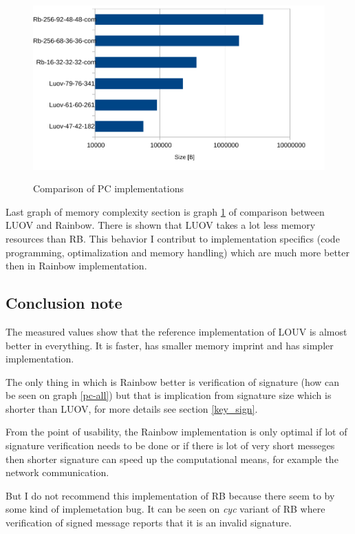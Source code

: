 \documentclass[thesis=M,english]{FITthesis}[2019/12/23]
\begin{document}
\begin{figure}[H]
\centering
\includegraphics[width=13cm,height=7cm]{images/mem-pc-all.pdf}
\caption{Comparison of PC implementations}
\label{mem-pc-all}
\end{figure}

\noindent
Last graph of memory complexity section is graph \ref{mem-pc-all} of comparison between LUOV and Rainbow. There is shown that LUOV takes a lot less memory resources than RB.  This behavior I contribut to implementation specifics (code programming, optimalization and memory handling) which are much more better then in Rainbow implementation.

\subsection{Conclusion note}
The measured values show that the reference implementation of LOUV is almost better in everything. It is faster, has smaller memory imprint and has simpler implementation.

\bigskip
\noindent
The only thing in which is Rainbow better is verification of signature (how can be seen on graph \ref{pc-all}) but that is implication from signature size which is shorter than LUOV, for more details see section \ref{key_sign}.

\bigskip
\noindent
From the point of usability, the Rainbow implementation is only optimal if lot of signature verification needs to be done or if there is lot of very short messeges then shorter signature can speed up the computational means, for example the network communication.

\bigskip
\noindent
But I do not recommend this implementation of RB because there seem to by some kind of implemetation bug. It can be seen on \textit{cyc} variant of RB where verification of signed message reports that it is an invalid signature.
\end{document}
